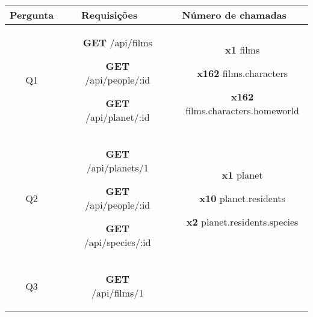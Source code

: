 \begin{table}[H]
  \centering
  \begin{tabular}{|c|c|c|}
    \hline
    Pergunta & Requisições & Número de chamadas \\
    \hline
    Q1 & \begin{minipage}[t]{0.3\textwidth}
      \begin{itemize}
        \item[\textbf{GET}] /api/films
        \item[\textbf{GET}] /api/people/:id
        \item[\textbf{GET}] /api/planet/:id
      \end{itemize}
    \end{minipage} & \begin{minipage}[t]{0.5\textwidth}
      \begin{itemize}
        \item[\textbf{x1}] films
        \item[\textbf{x162}] films.characters
        \item[\textbf{x162}] films.characters.homeworld
      \end{itemize}
    \end{minipage} \\
    \hline
    Q2 & \begin{minipage}[t]{0.3\textwidth}
      \begin{itemize}
        \item[\textbf{GET}] /api/planets/1
        \item[\textbf{GET}] /api/people/:id
        \item[\textbf{GET}] /api/species/:id
      \end{itemize}
    \end{minipage} & \begin{minipage}[t]{0.5\textwidth}
      \begin{itemize}
        \item[\textbf{x1}] planet
        \item[\textbf{x10}] planet.residents
        \item[\textbf{x2}] planet.residents.species
      \end{itemize}
    \end{minipage} \\
    \hline
    Q3 & \begin{minipage}[t]{0.3\textwidth}
      \begin{itemize}
        \item[\textbf{GET}] /api/films/1

\end{itemize}
\end{minipage}
\end{tabular}
\end{table}
